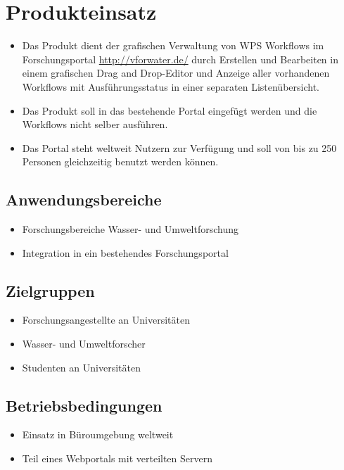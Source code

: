 
\chapter{Produkteinsatz}
    \begin{itemize}
    	\item Das Produkt dient der grafischen Verwaltung von WPS Workflows im Forschungsportal \url{http://vforwater.de/} durch Erstellen und Bearbeiten in einem grafischen \Gls{Drag and Drop}-Editor und Anzeige aller vorhandenen Workflows mit Ausführungsstatus in einer separaten Listenübersicht.
    	\item Das Produkt soll in das bestehende Portal eingefügt werden und die Workflows nicht selber ausführen.
    	\item Das Portal steht weltweit Nutzern zur Verfügung und soll von bis zu 250 Personen gleichzeitig benutzt werden können.
    \end{itemize}
	
	\section{Anwendungsbereiche}
		\begin{itemize}
			\item Forschungsbereiche Wasser- und Umweltforschung
			\item Integration in ein bestehendes Forschungsportal
		\end{itemize}	
	
	\section{Zielgruppen}
		\begin{itemize}
			\item Forschungsangestellte an Universitäten
			\item Wasser- und Umweltforscher
			\item Studenten an Universitäten
		\end{itemize}	
	
	\section{Betriebsbedingungen}
		\begin{itemize}
			\item Einsatz in Büroumgebung weltweit
			\item Teil eines Webportals mit verteilten Servern
		\end{itemize}
